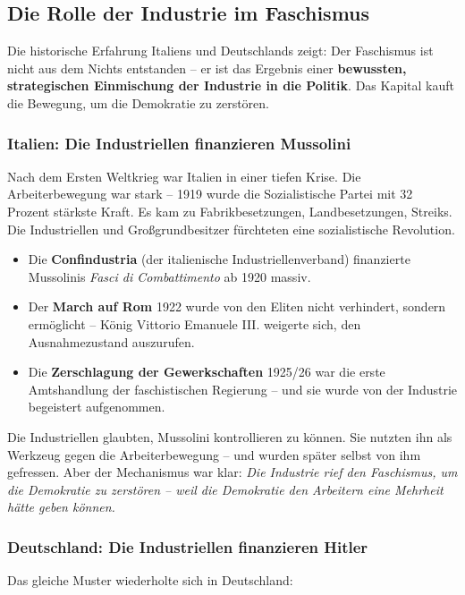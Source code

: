 \subsection{Die Rolle der Industrie im Faschismus}

Die historische Erfahrung Italiens und Deutschlands zeigt: Der Faschismus ist nicht aus dem Nichts entstanden – er ist das Ergebnis einer \textbf{bewussten, strategischen Einmischung der Industrie in die Politik}. Das Kapital kauft die Bewegung, um die Demokratie zu zerstören.

\subsubsection{Italien: Die Industriellen finanzieren Mussolini}

Nach dem Ersten Weltkrieg war Italien in einer tiefen Krise. Die Arbeiterbewegung war stark – 1919 wurde die Sozialistische Partei mit 32 Prozent stärkste Kraft. Es kam zu Fabrikbesetzungen, Landbesetzungen, Streiks. Die Industriellen und Großgrundbesitzer fürchteten eine sozialistische Revolution.

\begin{itemize}
    \item Die \textbf{Confindustria} (der italienische Industriellenverband) finanzierte Mussolinis \emph{Fasci di Combattimento} ab 1920 massiv.
    \item Der \textbf{March auf Rom} 1922 wurde von den Eliten nicht verhindert, sondern ermöglicht – König Vittorio Emanuele III. weigerte sich, den Ausnahmezustand auszurufen.
    \item Die \textbf{Zerschlagung der Gewerkschaften} 1925/26 war die erste Amtshandlung der faschistischen Regierung – und sie wurde von der Industrie begeistert aufgenommen.
\end{itemize}

Die Industriellen glaubten, Mussolini kontrollieren zu können. Sie nutzten ihn als Werkzeug gegen die Arbeiterbewegung – und wurden später selbst von ihm gefressen. Aber der Mechanismus war klar: \emph{Die Industrie rief den Faschismus, um die Demokratie zu zerstören – weil die Demokratie den Arbeitern eine Mehrheit hätte geben können.}

\subsubsection{Deutschland: Die Industriellen finanzieren Hitler}

Das gleiche Muster wiederholte sich in Deutschland:

